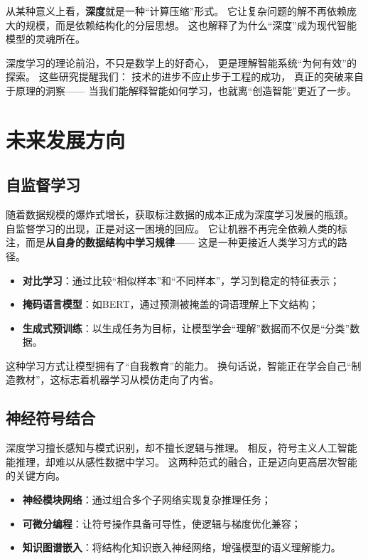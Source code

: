 从某种意义上看，\textbf{深度}就是一种“计算压缩”形式。  
它让复杂问题的解不再依赖庞大的规模，而是依赖结构化的分层思想。  
这也解释了为什么“深度”成为现代智能模型的灵魂所在。  

深度学习的理论前沿，不只是数学上的好奇心，  
更是理解智能系统“为何有效”的探索。  
这些研究提醒我们：  
技术的进步不应止步于工程的成功，  
真正的突破来自于原理的洞察——  
当我们能解释智能如何学习，也就离“创造智能”更近了一步。

\section{未来发展方向}

\subsection{自监督学习}

随着数据规模的爆炸式增长，获取标注数据的成本正成为深度学习发展的瓶颈。  
自监督学习的出现，正是对这一困境的回应。  
它让机器不再完全依赖人类的标注，而是\textbf{从自身的数据结构中学习规律}——  
这是一种更接近人类学习方式的路径。

\begin{itemize}
\item \textbf{对比学习}：通过比较“相似样本”和“不同样本”，学习到稳定的特征表示；
\item \textbf{掩码语言模型}：如BERT，通过预测被掩盖的词语理解上下文结构；
\item \textbf{生成式预训练}：以生成任务为目标，让模型学会“理解”数据而不仅是“分类”数据。
\end{itemize}

这种学习方式让模型拥有了“自我教育”的能力。  
换句话说，智能正在学会自己“制造教材”，这标志着机器学习从模仿走向了内省。

\subsection{神经符号结合}

深度学习擅长感知与模式识别，却不擅长逻辑与推理。  
相反，符号主义人工智能能推理，却难以从感性数据中学习。  
这两种范式的融合，正是迈向更高层次智能的关键方向。

\begin{itemize}
\item \textbf{神经模块网络}：通过组合多个子网络实现复杂推理任务；
\item \textbf{可微分编程}：让符号操作具备可导性，使逻辑与梯度优化兼容；
\item \textbf{知识图谱嵌入}：将结构化知识嵌入神经网络，增强模型的语义理解能力。
\end{itemize}

